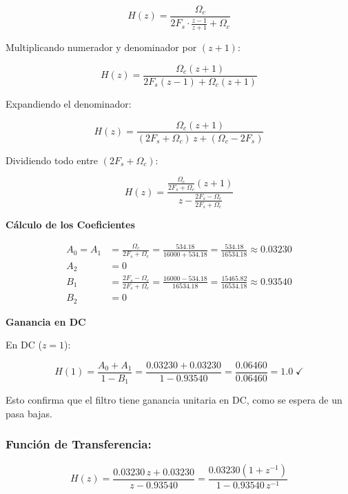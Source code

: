 \begin{equation}
    H(z) = \frac{\Omega_c}{2F_s \cdot \frac{z-1}{z+1} + \Omega_c}
\end{equation}

Multiplicando numerador y denominador por $(z+1)$:

\begin{equation}
    H(z) = \frac{\Omega_c(z+1)}{2F_s(z-1) + \Omega_c(z+1)}
\end{equation}

Expandiendo el denominador:

\begin{equation}
    H(z) = \frac{\Omega_c(z+1)}{(2F_s + \Omega_c)\,z + (\Omega_c - 2F_s)}
\end{equation}

Dividiendo todo entre $(2F_s + \Omega_c)$:

\begin{equation}
    H(z) = \frac{\frac{\Omega_c}{2F_s + \Omega_c}(z + 1)}{z - \frac{2F_s - \Omega_c}{2F_s + \Omega_c}}
\end{equation}

\textbf{Cálculo de los Coeficientes}

\begin{align}
    A_0 = A_1 &= \frac{\Omega_c}{2F_s + \Omega_c} = \frac{534.18}{16000 + 534.18} = \frac{534.18}{16534.18} \approx 0.03230 \\[6pt]
    A_2 &= 0 \\[6pt]
    B_1 &= \frac{2F_s - \Omega_c}{2F_s + \Omega_c} = \frac{16000 - 534.18}{16534.18} = \frac{15465.82}{16534.18} \approx 0.93540 \\[6pt]
    B_2 &= 0
\end{align}

\textbf{Ganancia en DC}

En DC ($z = 1$):

\begin{equation}
    H(1) = \frac{A_0 + A_1}{1 - B_1} = \frac{0.03230 + 0.03230}{1 - 0.93540} = \frac{0.06460}{0.06460} = 1.0 \;\checkmark
\end{equation}

Esto confirma que el filtro tiene ganancia unitaria en DC, como se espera de un pasa bajas.

\subsubsection{Función de Transferencia:}

\begin{equation}
    \boxed{H(z) = \frac{0.03230\,z + 0.03230}{z - 0.93540} = \frac{0.03230(1 + z^{-1})}{1 - 0.93540\,z^{-1}}}
    \label{eq:lp_Hz}
\end{equation}

